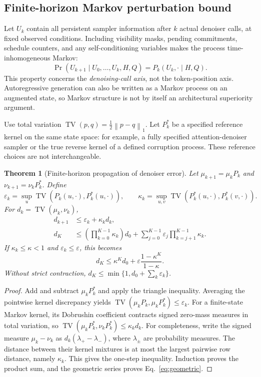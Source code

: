 \documentclass{article}
\newtheorem{theorem}{Theorem}[section]
\theoremstyle{remark}\newtheorem{remark}[theorem]{Remark}
\newcommand{\TV}{\operatorname{TV}}
\newcommand{\norm}[1]{\left\lVert #1\right\rVert}
\begin{document}
\subsection{Finite-horizon Markov perturbation bound}
\label{sec:markov}
Let $U_k$ contain all persistent sampler information after $k$ actual denoiser calls, at fixed observed conditions. Including visibility masks, pending commitments, schedule counters, and any self-conditioning variables makes the process time-inhomogeneous Markov:
\begin{equation}
 \Pr(U_{k+1}\mid U_0,\ldots,U_k,H,Q)
 =P_k(U_k,\cdot\mid H,Q).
\end{equation}
This property concerns the \emph{denoising-call axis}, not the token-position axis. Autoregressive generation can also be written as a Markov process on an augmented state, so Markov structure is not by itself an architectural superiority argument.

Use total variation $\TV(p,q)=\tfrac12\norm{p-q}_1$. Let $P_k^*$ be a specified reference kernel on the same state space: for example, a fully specified attention-denoiser sampler or the true reverse kernel of a defined corruption process. These reference choices are not interchangeable.

\begin{theorem}[Finite-horizon propagation of denoiser error]
\label{thm:markov}
Let $\mu_{k+1}=\mu_kP_k$ and $\nu_{k+1}=\nu_kP_k^*$. Define
\begin{equation}
 \varepsilon_k=\sup_u\TV(P_k(u,\cdot),P_k^*(u,\cdot)),\qquad
 \kappa_k=\sup_{u,v}\TV(P_k^*(u,\cdot),P_k^*(v,\cdot)).
\end{equation}
For $d_k=\TV(\mu_k,\nu_k)$,
\begin{align}
 d_{k+1}&\le\varepsilon_k+\kappa_k d_k,\\
 d_K&\le\left(\prod_{k=0}^{K-1}\kappa_k\right)d_0
 +\sum_{j=0}^{K-1}\varepsilon_j\prod_{k=j+1}^{K-1}\kappa_k.
 \label{eq:markovbound}
\end{align}
If $\kappa_k\le\kappa<1$ and $\varepsilon_k\le\varepsilon$, this becomes
\begin{equation}
 d_K\le\kappa^K d_0+\varepsilon\frac{1-\kappa^K}{1-\kappa}.
 \label{eq:geometric}
\end{equation}
Without strict contraction, $d_K\le\min\{1,d_0+\sum_k\varepsilon_k\}$.
\end{theorem}
\begin{proof}
Add and subtract $\mu_kP_k^*$ and apply the triangle inequality. Averaging the pointwise kernel discrepancy yields
$\TV(\mu_kP_k,\mu_kP_k^*)\le\varepsilon_k$.
For a finite-state Markov kernel, its Dobrushin coefficient contracts signed zero-mass measures in total variation, so
$\TV(\mu_kP_k^*,\nu_kP_k^*)\le\kappa_kd_k$.
For completeness, write the signed measure $\mu_k-\nu_k$ as $d_k(\lambda_+-\lambda_-)$, where $\lambda_\pm$ are probability measures. The distance between their kernel mixtures is at most the largest pairwise row distance, namely $\kappa_k$. This gives the one-step inequality. Induction proves the product sum, and the geometric series proves Eq.~\eqref{eq:geometric}.
\end{proof}
\end{document}
